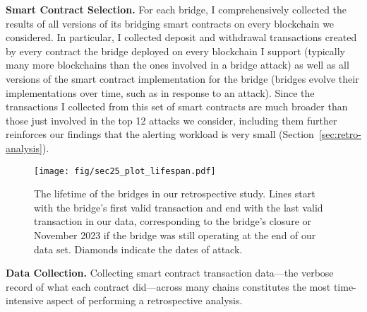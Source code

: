 \textbf{Smart Contract Selection.}
%
For each bridge, I comprehensively collected the results of all
versions of its bridging smart contracts on every blockchain we
considered.  In particular, I collected deposit and withdrawal
transactions created by every contract the bridge deployed on
every blockchain I support (typically many more blockchains than the
ones involved in a bridge attack) as well as all versions of the smart
contract implementation for the bridge (bridges evolve their
implementations over time, such as in response to an attack).
%
Since the transactions I collected from this set of smart contracts
are much broader than those just involved in the top 12 attacks we
consider, including them further reinforces our findings that the
alerting workload is very small (Section~\ref{sec:retro-analysis}).




\begin{figure}[t]
  \centering
  \texttt{[image: fig/sec25\_plot\_lifespan.pdf]}
  \caption[The Lifetime of Bridges in Our Study]{The lifetime of the bridges in our retrospective study.
    Lines start with the bridge's first valid transaction and end with the
    last valid transaction in our data, corresponding to the bridge's
    closure or November 2023 if the bridge was still operating at the
    end of our data set.  Diamonds indicate the dates of attack.}
  \label{fig:bridge-timeline}
\end{figure}


\textbf{Data Collection.}
Collecting smart contract transaction data---the verbose record of
what each contract did---across many chains constitutes the most
time-intensive aspect of performing a retrospective analysis.

